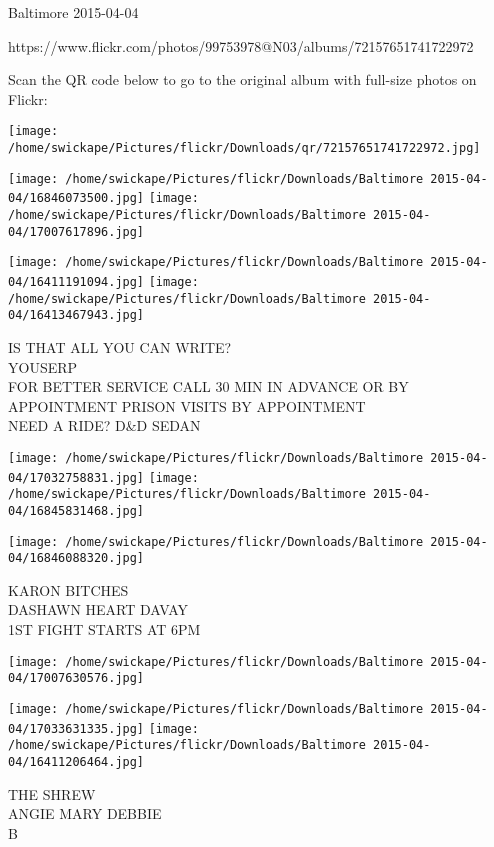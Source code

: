 \documentclass[10pt,letterpaper]{article}
\begin{document}
Baltimore 2015-04-04

https://www.flickr.com/photos/99753978@N03/albums/72157651741722972

Scan the QR code below to go to the original album with full-size photos on Flickr:

\texttt{[image: /home/swickape/Pictures/flickr/Downloads/qr/72157651741722972.jpg]}
\pagebreak

\texttt{[image: /home/swickape/Pictures/flickr/Downloads/Baltimore 2015-04-04/16846073500.jpg]}
\texttt{[image: /home/swickape/Pictures/flickr/Downloads/Baltimore 2015-04-04/17007617896.jpg]}

\texttt{[image: /home/swickape/Pictures/flickr/Downloads/Baltimore 2015-04-04/16411191094.jpg]}
\texttt{[image: /home/swickape/Pictures/flickr/Downloads/Baltimore 2015-04-04/16413467943.jpg]}

IS THAT ALL YOU CAN WRITE?\\
YOUSERP\\
FOR BETTER SERVICE CALL 30 MIN IN ADVANCE OR BY APPOINTMENT PRISON VISITS BY APPOINTMENT\\
NEED A RIDE?  D\&D SEDAN\\
\pagebreak

\texttt{[image: /home/swickape/Pictures/flickr/Downloads/Baltimore 2015-04-04/17032758831.jpg]}
\texttt{[image: /home/swickape/Pictures/flickr/Downloads/Baltimore 2015-04-04/16845831468.jpg]}

\texttt{[image: /home/swickape/Pictures/flickr/Downloads/Baltimore 2015-04-04/16846088320.jpg]}

KARON BITCHES\\
DASHAWN HEART DAVAY\\
1ST FIGHT STARTS AT 6PM\\
\pagebreak

\texttt{[image: /home/swickape/Pictures/flickr/Downloads/Baltimore 2015-04-04/17007630576.jpg]}

\vspace{0.25in}
\texttt{[image: /home/swickape/Pictures/flickr/Downloads/Baltimore 2015-04-04/17033631335.jpg]}
\texttt{[image: /home/swickape/Pictures/flickr/Downloads/Baltimore 2015-04-04/16411206464.jpg]}

THE SHREW\\
ANGIE MARY DEBBIE\\
B\\
\pagebreak
\end{document}
